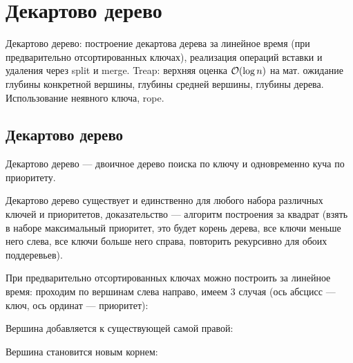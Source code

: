 \section{Декартово дерево}
Декартово дерево: построение декартова дерева за линейное время
(при предварительно отсортированных ключах),
реализация операций вставки и удаления через split и merge.
Treap: верхняя оценка $\mathcal{O}(\log n)$ на мат. ожидание
глубины конкретной вершины, глубины средней вершины,
глубины дерева.
Использование неявного ключа, rope.

\subsection{Декартово дерево}
Декартово дерево --- двоичное дерево поиска по ключу
и одновременно куча по приоритету.

Декартово дерево существует и единственно
для любого набора различных ключей и приоритетов,
доказательство --- алгоритм построения за квадрат
(взять в наборе максимальный приоритет,
это будет корень дерева,
все ключи меньше него слева,
все ключи больше него справа,
повторить рекурсивно для обоих поддеревьев).

При предварительно отсортированных ключах
можно построить за линейное время:
проходим по вершинам слева направо,
имеем 3 случая
(ось абсцисс --- ключ, ось ординат --- приоритет):

\bigskip

\noindent
\begin{minipage}{\textwidth}
    \begin{center}
        Вершина добавляется к существующей самой правой:

    \end{center}
\end{minipage}

\bigskip

\noindent
\begin{minipage}{\textwidth}
    \begin{center}
        Вершина становится новым корнем:

    \end{center}
\end{minipage}

